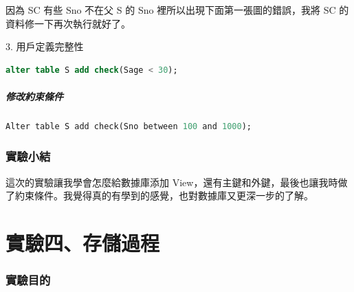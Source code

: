 \documentclass[12pt, a4paper]{report}
\begin{document}
因為 SC 有些 Sno 不在父 S 的 Sno 裡所以出現下面第一張圖的錯誤，我將 SC 的資料修一下再次執行就好了。

\begin{figure}[H] %
    \centering %
\end{figure}

\begin{figure}[H] %
    \centering %
\end{figure}

3. 用戶定義完整性

\begin{lstlisting}[language=SQL]
    alter table S add check(Sage < 30);
\end{lstlisting}

\subsubsection{修改約束條件}

\begin{lstlisting}[language=SQL]
    Alter table S add check(Sno between 100 and 1000);
\end{lstlisting}

\section{實驗小結}

這次的實驗讓我學會怎麼給數據庫添加 View，還有主鍵和外鍵，最後也讓我時做了約束條件。我覺得真的有學到的感覺，也對數據庫又更深一步的了解。

\part{實驗四、存儲過程}

\section{實驗目的}
\end{document}
